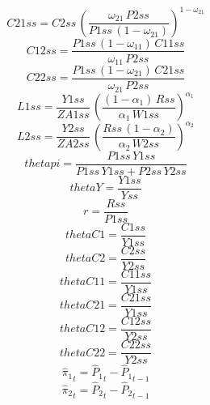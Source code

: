 \begin{dmath*}
C21ss = {C2ss}\, \left(\frac{{{\omega_{21}}}\, {P2ss}}{{P1ss}\, \left(1-{{\omega_{21}}}\right)}\right)^{1-{{\omega_{21}}}}
\end{dmath*}
\begin{dmath*}
C12ss = \frac{{P1ss}\, \left(1-{{\omega_{11}}}\right)\, {C11ss}}{{{\omega_{11}}}\, {P2ss}}
\end{dmath*}
\begin{dmath*}
C22ss = \frac{{P1ss}\, \left(1-{{\omega_{21}}}\right)\, {C21ss}}{{{\omega_{21}}}\, {P2ss}}
\end{dmath*}
\begin{dmath*}
L1ss = \frac{{Y1ss}}{{ZA1ss}}\, \left(\frac{\left(1-{{\alpha_{1}}}\right)\, {Rss}}{{{\alpha_{1}}}\, {W1ss}}\right)^{{{\alpha_{1}}}}
\end{dmath*}
\begin{dmath*}
L2ss = \frac{{Y2ss}}{{ZA2ss}}\, \left(\frac{{Rss}\, \left(1-{{\alpha_{2}}}\right)}{{{\alpha_{2}}}\, {W2ss}}\right)^{{{\alpha_{2}}}}
\end{dmath*}
\begin{dmath*}
thetapi = \frac{{P1ss}\, {Y1ss}}{{P1ss}\, {Y1ss}+{P2ss}\, {Y2ss}}
\end{dmath*}
\begin{dmath*}
thetaY = \frac{{Y1ss}}{{Yss}}
\end{dmath*}
\begin{dmath*}
r = \frac{{Rss}}{{P1ss}}
\end{dmath*}
\begin{dmath*}
thetaC1 = \frac{{C1ss}}{{Y1ss}}
\end{dmath*}
\begin{dmath*}
thetaC2 = \frac{{C2ss}}{{Y2ss}}
\end{dmath*}
\begin{dmath*}
thetaC11 = \frac{{C11ss}}{{Y1ss}}
\end{dmath*}
\begin{dmath*}
thetaC21 = \frac{{C21ss}}{{Y1ss}}
\end{dmath*}
\begin{dmath*}
thetaC12 = \frac{{C12ss}}{{Y2ss}}
\end{dmath*}
\begin{dmath*}
thetaC22 = \frac{{C22ss}}{{Y2ss}}
\end{dmath*}
\begin{dmath}
{{\hat{\pi}_{1}}}_{t}={{\hat{P}_{1}}}_{t}-{{\hat{P}_{1}}}_{t-1}
\end{dmath}
\begin{dmath}
{{\hat{\pi}_{2}}}_{t}={{\hat{P}_{2}}}_{t}-{{\hat{P}_{2}}}_{t-1}
\end{dmath}
